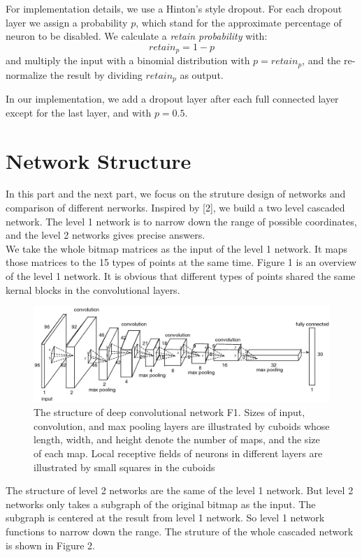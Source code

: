 \documentclass[10pt,twocolumn,letterpaper]{article}
\begin{document}
For implementation details, we use a Hinton's style dropout\cite{hinton2012improving}.
For each dropout layer we assign a probability $p$, which stand for the approximate percentage of
neuron to be disabled. We calculate a \emph{retain probability} with:
$$
retain_p = 1 - p
$$
and multiply the input with a binomial distribution with $p=retain_p$, and the re-normalize the result
by dividing $retain_p$ as output.

In our implementation, we add a dropout layer after each full connected layer except for the last layer,
and with $p=0.5$.

\section{Network Structure}

In this part and the next part, we focus on the struture design of networks and comparison of different nerworks. Inspired by [2], we build a two level cascaded network. The level 1 network is to narrow down the range of possible coordinates, and the level 2 networks gives precise answers. \\

We take the whole bitmap matrices as the input of the level 1 network. It maps those matrices to the 15 types of points at the same time. Figure 1 is an overview of the level 1 network. It is obvious that different types of points shared the same kernal blocks in the convolutional layers. \\

\begin{figure}[htbp]
\centering
\includegraphics[width=0.8\linewidth]{figure1.eps}
   \caption{The structure of deep convolutional network F1. Sizes of input, convolution, and max pooling layers are illustrated by cuboids whose length, width, and height denote the number of maps, and the size of each map. Local receptive fields of neurons in different layers are illustrated by small squares in the cuboids}
\label{fig:single}
\end{figure}

The structure of level 2 networks are the same of the level 1 network. But level 2 networks only takes a subgraph of the original bitmap as the input. The subgraph is centered at the result from level 1 network. So level 1 network functions to narrow down the range. The struture of the whole cascaded network is shown in Figure 2. \\
\end{document}
